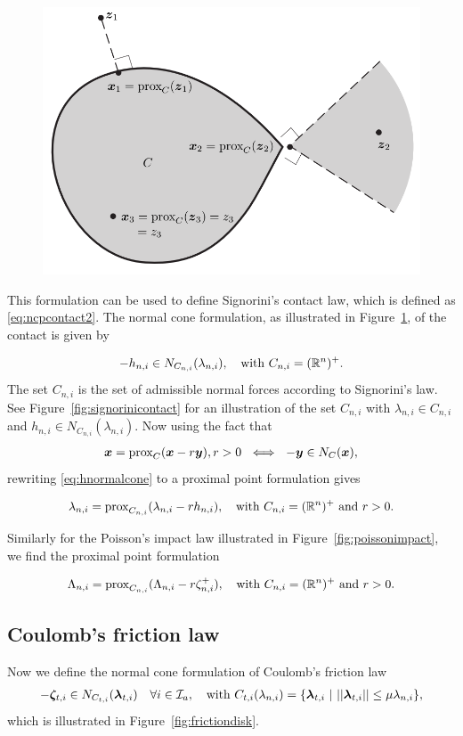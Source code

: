 \documentclass[../DC2017114Bouma.tex]{subfiles}
\begin{document}
\begin{figure}[h]
\centering
\includegraphics[width=.6\textwidth]{convex.PNG}\caption{}\label{fig:convex}
\end{figure}

This formulation can be used to define Signorini's contact law, which is defined as \eqref{eq:ncpcontact2}. The normal cone formulation, as illustrated in Figure~\ref{fig:convex}, of the contact is given by

\begin{align}
-h_{n,i} \in N_{C_{n,i}}(\lambda_{n,i}),\quad \text{with }C_{n,i} = (\mathbb{R}^n)^+.\label{eq:hnormalcone}
\end{align}
The set $C_{n,i}$ is the set of admissible normal forces according to Signorini's law. See Figure~\ref{fig:signorinicontact} for an illustration of the set $C_{n,i}$ with $\lambda_{n,i}\in C_{n,i}$ and $h_{n,i} \in N_{C_{n,i}}(\lambda_{n,i})$. Now using the fact that
\begin{align}
{\boldsymbol{x}} = \operatorname{\text{prox}}_C({\boldsymbol{x}} -r{\boldsymbol{y}}), r > 0\ \iff\ -{\boldsymbol{y}}\in N_C({\boldsymbol{x}}),
\end{align}
rewriting \eqref{eq:hnormalcone} to a proximal point formulation gives 

\begin{align}
\lambda_{n,i} = \operatorname{\text{prox}}_{C_{n,i}}(\lambda_{n,i} - rh_{n,i}),\quad \text{with }C_{n,i} = (\mathbb{R}^n)^+\text{ and } r>0.
\end{align}

Similarly for the Poisson's impact law illustrated in Figure~\ref{fig:poissonimpact}, we find the proximal point formulation

\begin{align}
\Lambda_{n,i} = \operatorname{\text{prox}}_{C_{n,i}}(\Lambda_{n,i} - r\zeta^+_{n,i}),\quad \text{with }C_{n,i} = (\mathbb{R}^n)^+\text{ and } r>0.
\end{align}

\subsection{Coulomb's friction law}
Now we define the normal cone formulation of Coulomb's friction law
\begin{align}
-\zetab_{t,i} \in N_{C_{t,i}}(\lambdab_{t,i})\quad \forall i\in\Ic_a,\quad \text{with }C_{t,i}(\lambda_{n,i}) = \{\lambdab_{t,i}\ |\ ||\lambdab_{t,i}|| \leq \mu\lambda_{n,i}\},
\end{align}
which is illustrated in Figure~\ref{fig:frictiondisk}.  
\end{document}
